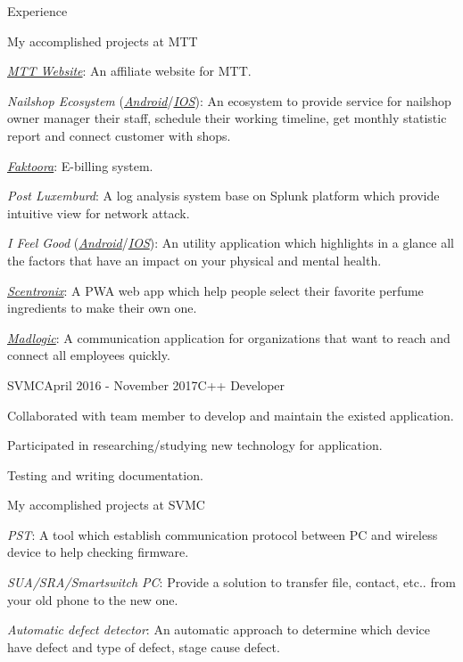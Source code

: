 \documentclass{resume}
\begin{document}
\begin{rSection}{Experience}
    \begin{rSubsection}{}{}{My accomplished projects at MTT}{}
      \item \href{https://mttjsc.com/}{\emph{MTT Website}}: An affiliate website for MTT.
      \item \emph{Nailshop Ecosystem} (\href{https://play.google.com/store/apps/developer?id=MTT+Software+Company+LTD/}{\emph{Android}}/\href{https://apps.apple.com/us/developer/mttjsc/id1250334932}{\emph{IOS}}): 
      An ecosystem to provide service for nailshop owner manager their
      staff, schedule their working timeline, get monthly statistic report and connect customer with shops.
      \item \href{http://app.faktoora.com}{\emph{Faktoora}}: E-billing system.
      \item \emph{Post Luxemburd}: A log analysis system base on Splunk platform which provide intuitive view for network attack.
      \item \emph{I Feel Good} (\href{https://play.google.com/store/apps/details?id=com.ifg_mobile}{\emph{Android}}/\href{}{\emph{IOS}}): 
      An utility application which highlights in a glance all the factors that have an impact on your physical and mental health.
      \item \href{https://app.scnt.me/}{\emph{Scentronix}}: A PWA web app which help people select their favorite perfume ingredients to make their own one.
      \item \href{https://www.madlogic.nl/magic/}{\emph{Madlogic}}: A communication application for organizations that want to reach and connect all employees quickly.
    \end{rSubsection}
  
    \begin{rSubsection}{SVMC}{April 2016 - November 2017}{C++ Developer}{}
      \item Collaborated with team member to develop and maintain the existed application.
      \item Participated in researching/studying new technology for application.
      \item Testing and writing documentation.
    \end{rSubsection}

    \begin{rSubsection}{}{}{My accomplished projects at SVMC}{}
      \item \emph{PST}: A tool which establish communication protocol between PC and wireless device to help checking firmware.
      \item \emph{SUA/SRA/Smartswitch PC}: Provide a solution to transfer file, contact, etc.. from your old phone to the new one.
      \item \emph{Automatic defect detector}: An automatic approach to determine which device have defect and type of defect, stage cause defect.
    \end{rSubsection}
  
  \end{rSection}
\end{document}

